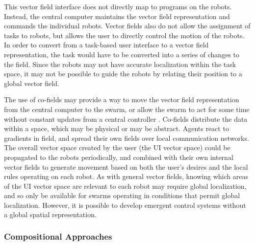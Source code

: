 \documentclass[]{article}
\begin{document}
This vector field interface does not directly map to programs on the robots. 
Instead, the central computer maintains the vector field representation and commands the individual robots.
Vector fields also do not allow the assignment of tasks to robots, but allows the user to directly control the motion of the robots. 
In order to convert from a task-based user interface to a vector field representation, the task would have to be converted into a series of changes to the field.
Since the robots may not have accurate localization within the task space, it may not be possible to guide the robots by relating their position to a global vector field. 

The use of co-fields may provide a way to move the vector field representation from the central computer to the swarm, or allow the swarm to act for some time without constant updates from a central controller \cite{mamei2003co}.
Co-fields distribute the data within a space, which may be physical or may be abstract. 
Agents react to gradients in field, and spread their own fields over local communication networks. 
The overall vector space created by the user (the UI vector space) could be propagated to the robots periodically, and combined with their own internal vector fields to generate movement based on both the user's desires and the local rules operating on each robot. 
As with general vector fields, knowing which areas of the UI vector space are relevant to each robot may require global localization, and so only be available for swarms operating in conditions that permit global localization. 
However, it is possible to develop emergent control systems without a global spatial representation.

\subsubsection{Compositional Approaches}
\end{document}
